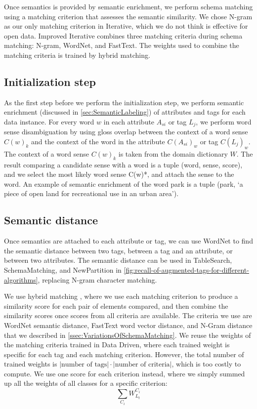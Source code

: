 Once semantics is provided by semantic enrichment, we perform schema matching using a matching criterion that assesses the semantic similarity. We chose N-gram as our only matching criterion in Iterative, which we do not think is effective for open data. Improved Iterative combines three matching criteria during schema matching: N-gram, WordNet, and FastText. The weights used to combine the matching criteria is trained by hybrid matching.

\subsection{Initialization step}

As the first step before we perform the initialization step, we perform semantic enrichment (discussed in \autoref{sec:SemanticLabeling}) of attributes and tags for each data instance. For every word $w$ in each attribute $A_{si}$ or tag $L_j$, we perform word sense disambiguation by using gloss overlap between the context of a word sense $C(w)_k$ and the context of the word in the attribute $C(A_{si})_w$ or tag $C(L_j)_w$. The context of a word sense $C(w)_k$ is taken from the domain dictionary $W$. The result comparing a candidate sense with a word is a tuple (word, sense, score), and we select the most likely word sense C(w)*, and attach the sense to the word. An example of semantic enrichment of the word park is a tuple (park, `a piece of open land for recreational use in an urban area').

\subsection{Semantic distance}

Once semantics are attached to each attribute or tag, we can use WordNet to find the semantic distance between two tags, between a tag and an attribute, or between two attributes. The semantic distance can be used in TableSearch, SchemaMatching, and NewPartition in \autoref{fig:recall-of-augmented-tags-for-different-algorithms}, replacing N-gram character matching.

We use hybrid matching \cite{Rahm2001Survey}, where we use each matching criterion to produce a similarity score for each pair of elements compared, and then combine the similarity scores once scores from all criteria are available. The criteria we use are WordNet semantic distance, FastText word vector distance, and N-Gram distance that we described in \autoref{ssec:VariationsOfSchemaMatching}. We reuse the weights of the matching criteria trained in Data Driven, where each trained weight is specific for each tag and each matching criterion. However, the total number of trained weights is $\left|\text{number of tags}\right|\cdot\left|\text{number of criteria}\right|$, which is too costly to compute. We use one score for each criterion instead, where we simply summed up all the weights of all classes for a specific criterion:
\[
\sum_{C_{i}}\ensuremath{W}_{L_{t}}^{C_{i}}
\]

